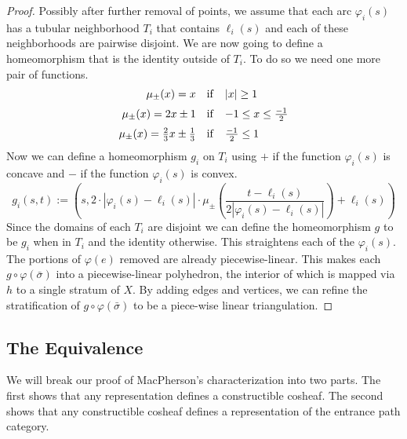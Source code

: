 \begin{proof}
	Possibly after further removal of points, we assume that each arc $\varphi_i(s)$ has a tubular neighborhood $T_i$ that contains $\ell_i(s)$ and each of these neighborhoods are pairwise disjoint. We are now going to define a homeomorphism that is the identity outside of $T_i$. To do so we need one more pair of functions.	
	\[
		\begin{array}{r c l} 
			\mu_{\pm}(x)=x & \mathrm{if} & |x|\geq 1 \\[\medskipamount]
						\mu_{\pm}(x)=2x\pm 1 & \mathrm{if} & -1 \leq x\leq \frac{-1}{2} \\[\medskipamount]
						\mu_{\pm}(x)=\frac{2}{3}x\pm \frac{1}{3} & \mathrm{if} & \frac{-1}{2} \leq 1
		\end{array}
	\]
	Now we can define a homeomorphism $g_i$ on $T_i$ using $+$ if the function $\varphi_i(s)$ is concave and $-$ if the function $\varphi_i(s)$ is convex.
	\[
		g_i(s,t):=(s,2\cdot|\varphi_i(s)-\ell_i(s)|\cdot\mu_{\pm}(\frac{t-\ell_i(s)}{2|\varphi_i(s)-\ell_i(s)|})+\ell_i(s))
	\]
	Since the domains of each $T_i$ are disjoint we can define the homeomorphism $g$ to be $g_i$ when in $T_i$ and the identity otherwise. This straightens each of the $\varphi_i(s)$. The portions of $\varphi(e)$ removed are already piecewise-linear. This makes each $g\circ \varphi(\bar{\sigma})$ into a piecewise-linear polyhedron, the interior of which is mapped via $h$ to a single stratum of $X$. By adding edges and vertices, we can refine the stratification of $g\circ \varphi(\bar{\sigma})$ to be a piece-wise linear triangulation.
\end{proof}	

\subsection{The Equivalence}
\label{subsec:equivalence_cosheaves}

We will break our proof of MacPherson's characterization into two parts. The first shows that any representation defines a constructible cosheaf. The second shows that any constructible cosheaf defines a representation of the entrance path category.

